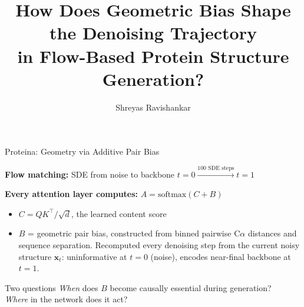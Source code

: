 \documentclass[10pt, aspectratio=169]{beamer}
\title{How Does Geometric Bias Shape the Denoising Trajectory\\in Flow-Based Protein Structure Generation?}
\author{Shreyas Ravishankar}
\institute{University of Cambridge}
\date{}
\begin{document}
\begin{frame}[plain]
\titlepage
\end{frame}

\begin{frame}{Proteina: Geometry via Additive Pair Bias}

\textbf{Flow matching:} SDE from noise to backbone \quad $t = 0 \xrightarrow{\text{100 SDE steps}} t = 1$

\medskip
\textbf{Every attention layer computes:} \quad $A = \mathrm{softmax}(C + B)$

\medskip
\begin{itemize}\setlength\itemsep{0.6em}
    \item $C = QK^\top\!/\sqrt{d}$, the learned content score
    \item $B$ = geometric pair bias, constructed from binned pairwise C$\alpha$ distances and sequence separation.
    Recomputed every denoising step from the current noisy structure $\mathbf{x}_t$:
    uninformative at $t{=}0$ (noise), encodes near-final backbone at $t{=}1$.
\end{itemize}

\vfill

\begin{block}{Two questions}
\emph{When} does $B$ become causally essential during generation?\\
\emph{Where} in the network does it act?
\end{block}

\end{frame}
\end{document}
